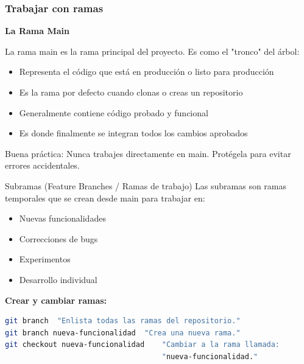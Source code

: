 \documentclass[aspectratio=169]{beamer}
\begin{document}
\begin{frame}[fragile]
\frametitle{Trabajar con ramas}
\textbf{La Rama Main}

La rama main es la rama principal del proyecto. Es como el "tronco" del árbol:

    \begin{itemize}
        \item Representa el código que está en producción o listo para producción
        \item Es la rama por defecto cuando clonas o creas un repositorio
        \item Generalmente contiene código probado y funcional
        \item Es donde finalmente se integran todos los cambios aprobados
    \end{itemize}

    Buena práctica: Nunca trabajes directamente en main. Protégela para evitar errores accidentales.
\end{frame}

\begin{frame}[fragile]
    Subramas (Feature Branches / Ramas de trabajo)
    Las subramas son ramas temporales que se crean desde main para trabajar en:

    \begin{itemize}
        \item Nuevas funcionalidades
        \item Correcciones de bugs
        \item Experimentos
        \item Desarrollo individual
    \end{itemize}

\textbf{Crear y cambiar ramas:}
\begin{lstlisting}[language=bash]
git branch  "Enlista todas las ramas del repositorio."
git branch nueva-funcionalidad  "Crea una nueva rama."
git checkout nueva-funcionalidad    "Cambiar a la rama llamada: 
                                    "nueva-funcionalidad."
\end{lstlisting}

\end{frame}
\end{document}
